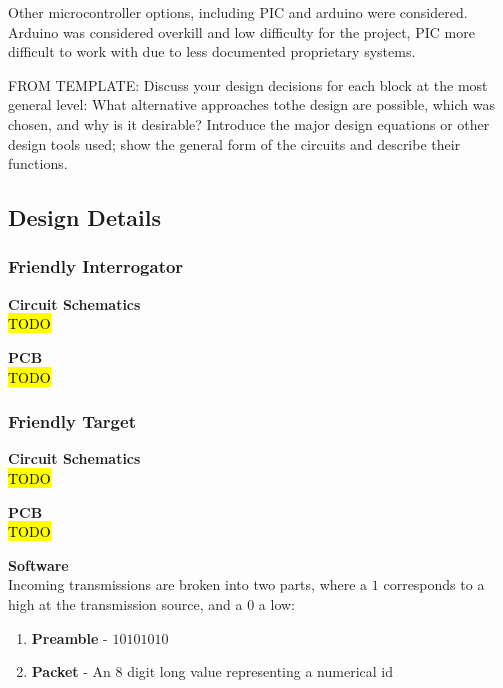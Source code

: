 \documentclass[letterpaper,10pt]{article}
\begin{document}
\begin{spacing}{1.15}
Other microcontroller options, including PIC and arduino were considered. Arduino was considered overkill and low difficulty for the project, PIC more difficult to work with due to less documented proprietary systems.

FROM TEMPLATE: Discuss your design decisions for each block at the most general level: What alternative approaches tothe design are possible, which was chosen, and why is it desirable? Introduce the major design equations or other design tools used; show the general form of the circuits and describe their functions.



\subsection{Design Details}


\subsubsection{Friendly Interrogator}
\hspace{5mm}\textbf{Circuit Schematics} \label{section:interrogator-circuit-schematics-design-details}
\\ \hl{TODO}

\hspace{5mm}\textbf{PCB} \label{section:interrogator-pcb-design-details}
\\ \hl{TODO}


\subsubsection{Friendly Target}
\hspace{5mm}\textbf{Circuit Schematics} \label{section:target-circuit-schematics-design-details}
\\ \hl{TODO}

\hspace{5mm}\textbf{PCB} \label{section:target-pcb-design-details}
\\ \hl{TODO}

\hspace{5mm} \textbf{Software} \label{section:target-software-design-details}\\
Incoming transmissions are broken into two parts, where a $1$ corresponds to a high at the transmission source, and a $0$ a low: 
\begin{enumerate}
	\small
	\item \textbf{Preamble} - $10101010$ 
	\item \textbf{Packet} - An 8 digit long value representing a numerical id
\end{enumerate}



\end{spacing}
\end{document}
